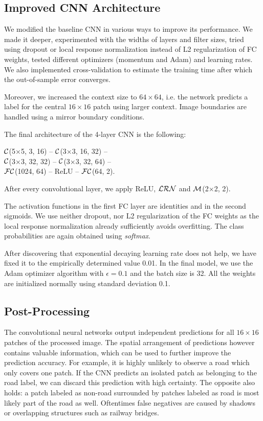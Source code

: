 \documentclass[10pt,conference,compsocconf]{IEEEtran}
\newcommand{\conv}[3]{$ \cal{C} $(#1$ \times  $#1, #2, #3)}
\newcommand{\maxpool}[2]{$ \cal{M} $(#1$ \times $#1, #2)}
\newcommand{\lrn}{$ \cal{LRN}~$}
\newcommand{\fc}[2]{$ \cal{FC} $(#1, #2)}
\begin{document}
\subsection{Improved CNN Architecture}
\label{subsec:CNN}
We modified the baseline CNN in various ways to improve its performance. We made it deeper, experimented with the widths of layers and filter sizes, tried using dropout or local response normalization instead of L2 regularization of FC weights, tested different optimizers (momentum and Adam) and learning rates. We also implemented cross-validation to estimate the training time after which the out-of-sample error converges.

Moreover, we increased the context size to $ 64\times64 $, i.e. the network predicts a label for the central $ 16\times16 $ patch using larger context. Image boundaries are handled using a mirror boundary conditions.

The final architecture of the 4-layer CNN is the following:
\begin{center}
	\conv{5}{3}{16} -- \conv{3}{16}{32} -- \\ 
	\conv{3}{32}{32} -- \conv{3}{32}{64} -- \\
	\fc{1024}{64} -- ReLU -- \fc{64}{2}.
\end{center}
After every convolutional layer, we apply ReLU, \lrn and \maxpool{2}{2}.

The activation functions in the first FC layer are identities and in the second sigmoids. We use neither dropout, nor L2 regularization of the FC weights as the local response normalization already sufficiently avoids overfitting. The class probabilities are again obtained using \textit{softmax}.

After discovering that exponential decaying learning rate does not help, we have fixed it to the empirically determined value 0.01. 
In the final model, we use the Adam optimizer algorithm \cite{Adam.2014} with $ \epsilon = 0.1 $ and the batch size is 32. All the weights are initialized normally using standard deviation 0.1.


\subsection{Post-Processing}
The convolutional neural networks output independent predictions for all $ 16 \times 16 $ patches of the processed image. The spatial arrangement of predictions however contains valuable information, which can be used to further improve the prediction accuracy. For example, it is highly unlikely to observe a road which only covers one patch. If the CNN predicts an isolated patch as belonging to the road label, we can discard this prediction with high certainty. The opposite also holds: a patch labeled as non-road surrounded by patches labeled as road is most likely part of the road as well. Oftentimes false negatives are caused by shadows or overlapping structures such as railway bridges.
\end{document}
